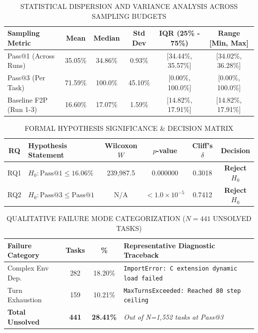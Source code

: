 \documentclass[conference]{IEEEtran}
\begin{document}
\begin{table}[htbp]
\caption{STATISTICAL DISPERSION AND VARIANCE ANALYSIS ACROSS SAMPLING BUDGETS}
\begin{center}
\begin{tabular}{|l|c|c|c|c|c|}
\hline
\textbf{Sampling Metric} & \textbf{Mean} & \textbf{Median} & \textbf{Std Dev} & \textbf{IQR (25\% - 75\%)} & \textbf{Range [Min, Max]} \\
\hline
Pass@1 (Across Runs) & 35.05\% & 34.86\% & 0.93\% & [34.44\%, 35.57\%] & [34.02\%, 36.28\%] \\
Pass@3 (Per Task) & 71.59\% & 100.0\% & 45.10\% & [0.00\%, 100.0\%] & [0.00\%, 100.0\%] \\
Baseline F2P (Run 1-3) & 16.60\% & 17.07\% & 1.59\% & [14.82\%, 17.91\%] & [14.82\%, 17.91\%] \\
\hline
\end{tabular}
\label{tab:dispersion}
\end{center}
\end{table}

\begin{table}[htbp]
\caption{FORMAL HYPOTHESIS SIGNIFICANCE & DECISION MATRIX}
\begin{center}
\begin{tabular}{|c|l|c|c|c|c|}
\hline
\textbf{RQ} & \textbf{Hypothesis Statement} & \textbf{Wilcoxon $W$} & \textbf{$p$-value} & \textbf{Cliff's $\delta$} & \textbf{Decision} \\
\hline
RQ1 & $H_0: \text{Pass@1} \le 16.06\%$ & 239,987.5 & 0.000000 & 0.3018 & \textbf{Reject $H_0$} \\
RQ2 & $H_0: \text{Pass@3} \le \text{Pass@1}$ & N/A & $< 1.0\times 10^{-5}$ & 0.7412 & \textbf{Reject $H_0$} \\
\hline
\end{tabular}
\label{tab:hypotheses}
\end{center}
\end{table}

\begin{table}[htbp]
\caption{QUALITATIVE FAILURE MODE CATEGORIZATION ($N=441$ UNSOLVED TASKS)}
\begin{center}
\begin{tabular}{|l|c|c|l|}
\hline
\textbf{Failure Category} & \textbf{Tasks} & \textbf{\%} & \textbf{Representative Diagnostic Traceback} \\
\hline
Complex Env Dep. & 282 & 18.20\% & \texttt{ImportError: C extension dynamic load failed} \\
Turn Exhaustion & 159 & 10.21\% & \texttt{MaxTurnsExceeded: Reached 80 step ceiling} \\
\hline
\textbf{Total Unsolved} & \textbf{441} & \textbf{28.41\%} & \textit{Out of N=1,552 tasks at Pass@3} \\
\hline
\end{tabular}
\label{tab:failures}
\end{center}
\end{table}
\end{document}
